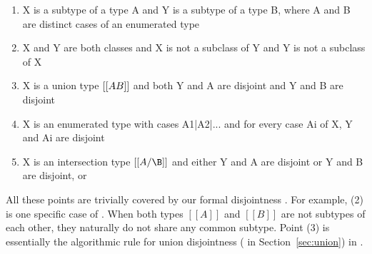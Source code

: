 \begin{enumerate}
  \item{X is a subtype of a type A and Y is a subtype of a type B, where A and B are distinct cases of an enumerated type}
  \item{X and Y are both classes and X is not a subclass of Y and Y is not a subclass of X}
  \item{X is a union type $[[A \/ B]]$ and both Y and A are disjoint and Y and B are disjoint}
  \item{X is an enumerated type with cases A1|A2|... and for every case Ai of X, Y and Ai are disjoint}
  \item{X is an intersection type $[[A/\B]]$ and either Y and A are disjoint or Y and B are disjoint, or}
\end{enumerate}

\noindent All these points are trivially covered by our formal disjointness .
For example, (2) is one specific case of .
When both types $[[A]]$ and
$[[B]]$ are not subtypes of each other, they naturally do not share any common subtype.
Point (3) is essentially the algorithmic
rule for union disjointness ( in Section~\ref{sec:union}) in \cal.
